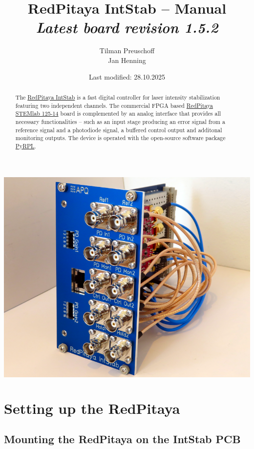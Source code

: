 \documentclass[twoside,a4paper]{refart}
\title{RedPitaya IntStab -- Manual\\
	\textit{\normalsize{Latest board revision 1.5.2}}}
\author{Tilman Preuschoff\\Jan Henning}
\date{Last modified: 28.10.2025}
\begin{document}
\maketitle
\begin{maxipage}
	\includegraphics[width=\textwidth]{fig/intstab.png}
\end{maxipage}
\begin{abstract}
	The \href{https://github.com/TU-Darmstadt-APQ/RedPitaya-IntStab}{RedPitaya IntStab} is a fast digital controller for laser intensity stabilization featuring two independent channels. The commercial FPGA based \href{https://www.redpitaya.com/f130/STEMlab-board}{RedPitaya STEMlab 125-14} board is complemented by an analog interface that provides all necessary functionalities -- such as an input stage producing an error signal from a reference signal and a photodiode signal, a buffered control output and additonal monitoring outputs. The device is operated with the open-source software package \href{https://pyrpl.readthedocs.io/en/latest/}{PyRPL}.  
\end{abstract}
\tableofcontents


\section{Setting up the RedPitaya}

\subsection{Mounting the RedPitaya on the IntStab PCB}
\end{document}
